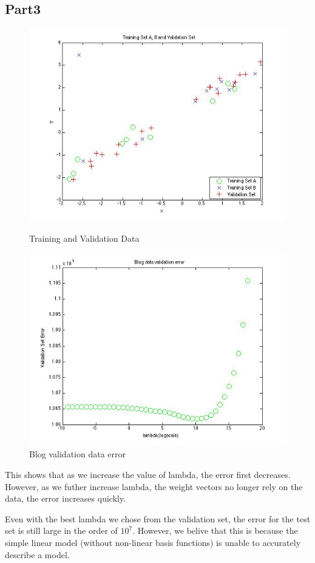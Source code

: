 \subsection{Part3}
\begin{figure}[!htb]
  \includegraphics[width=\linewidth]{figures/p3_training_validation_data}
  \caption{Training and Validation Data}\label{fig:figures/p3_training_validation_data}
  \endminipage\hfill
  \includegraphics[width=\linewidth]{figures/p3_blogdata_lambda}
  \caption{Blog validation data error}
  \endminipage\hfill

\end{figure}

This shows that as we increase the value of lambda, the error first decreases. However, as we futher
increase lambda, the weight vectors no longer rely on the data, the error increases quickly. 


Even with the best lambda we chose from the validation set, the error for the test set is still large
in the order of $10^{7}$. However, we belive that this is because the simple linear model (without non-linear basis functions) is unable to accurately describe a model. 
